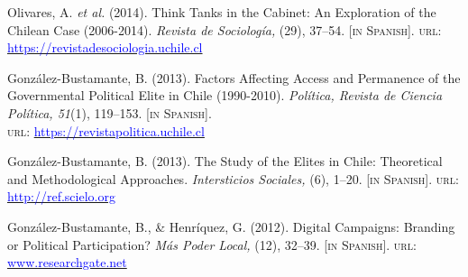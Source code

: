 \begin{publications}
\begin{benumerate}{9}
\item{\small Olivares, A. {\itshape et al.} (2014). Think Tanks in the Cabinet: An Exploration of the Chilean Case (2006-2014). {\itshape Revista de Sociolog\'ia,} (29), 37--54. {\footnotesize \scshape [in Spanish]}. {\scshape url}: \href{https://revistadesociologia.uchile.cl/index.php/RDS/article/view/36177}{\textcolor{blue}{https://revistadesociologia.uchile.cl}}} \vspace{1mm}

\item{\small Gonz\'alez-Bustamante, B. (2013). Factors Affecting Access and Permanence of the Governmental Political Elite in Chile (1990-2010). {\itshape Pol\'itica, Revista de Ciencia Pol\'itica, 51}(1), 119--153. {\footnotesize \scshape [in Spanish]}. \\ {\scshape url}: \href{https://revistapolitica.uchile.cl/index.php/RP/article/view/27436}{\textcolor{blue}{https://revistapolitica.uchile.cl}}} \vspace{1mm}

\item{\small Gonz\'alez-Bustamante, B. (2013). The Study of the Elites in Chile: Theoretical and Methodological Approaches. {\itshape Intersticios Sociales,} (6), 1--20. {\footnotesize \scshape [in Spanish]}. {\scshape url}: \href{http://ref.scielo.org/zrnp2k}{\textcolor{blue}{http://ref.scielo.org}}} \vspace{1mm}

\item{\small Gonz\'alez-Bustamante, B., \& Henr\'iquez, G. (2012). Digital Campaigns: Branding or Political Participation? {\itshape M\'as Poder Local,} (12), 32--39. {\footnotesize \scshape [in Spanish]}. {\scshape url}: \href{https://www.researchgate.net/publication/260517478_Campanas_digitales_Branding_o_participacion_politica_El_rol_de_las_redes_sociales_en_la_ultima_campana_presidencial_chilena}{\textcolor{blue}{www.researchgate.net}}} \vspace{1mm}
\end{benumerate}

\end{publications}
